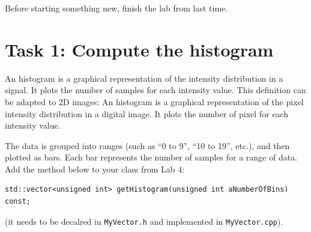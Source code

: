 \documentclass[english,a4paper,12pt,oneside]{article}
\begin{document}
Before starting something new, finish the lab from last time. 

\section*{Task 1: Compute the histogram}

An histogram is a graphical representation of the intensity distribution in a signal.
It plots the number of samples for each intensity value. 
This definition can be adapted to 2D images:
An histogram is a graphical representation of the pixel intensity distribution in a digital image.
It plots the number of pixel for each intensity value. 

The data is grouped into ranges (such as ``0 to 9'', ``10 to 19'', etc.), and then plotted as bars. 
Each bar represents the number of samples for a range of data. 
Add the method below to your class from Lab 4:\\

\begin{lstlisting}
std::vector<unsigned int> getHistogram(unsigned int aNumberOfBins) const;
\end{lstlisting}
(it needs to be decalred in \verb+MyVector.h+ and implemented in  \verb+MyVector.cpp+).
\end{document}
